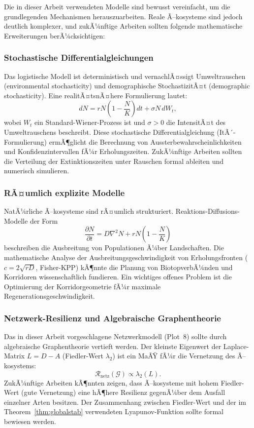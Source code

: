 ﻿\documentclass[a4paper,12pt]{article}
\theoremstyle{definition}
\begin{document}
Die in dieser Arbeit verwendeten Modelle sind bewusst vereinfacht, um die grundlegenden Mechanismen herauszuarbeiten. Reale Ã–kosysteme sind jedoch deutlich komplexer, und zukÃ¼nftige Arbeiten sollten folgende mathematische Erweiterungen berÃ¼cksichtigen:

\subsubsection{Stochastische Differentialgleichungen}

Das logistische Modell ist deterministisch und vernachlÃ¤ssigt Umweltrauschen (environmental stochasticity) und demographische StochastizitÃ¤t (demographic stochasticity). Eine realitÃ¤tsnÃ¤here Formulierung lautet:
\[
dN = r N\!\left(1 - \frac{N}{K}\right) dt + \sigma N\, dW_t,
\]
wobei $W_t$ ein Standard-Wiener-Prozess ist und $\sigma > 0$ die IntensitÃ¤t des Umweltrauschens beschreibt. Diese stochastische Differentialgleichung (ItÃ´-Formulierung) ermÃ¶glicht die Berechnung von Aussterbewahrscheinlichkeiten und Konfidenzintervallen fÃ¼r Erholungszeiten. ZukÃ¼nftige Arbeiten sollten die Verteilung der Extinktionszeiten unter Rauschen formal ableiten und numerisch simulieren.

\subsubsection{RÃ¤umlich explizite Modelle}

NatÃ¼rliche Ã–kosysteme sind rÃ¤umlich strukturiert. Reaktions-Diffusions-Modelle der Form
\[
\frac{\partial N}{\partial t} = D \nabla^2 N + rN\!\left(1 - \frac{N}{K}\right)
\]
beschreiben die Ausbreitung von Populationen Ã¼ber Landschaften. Die mathematische Analyse der Ausbreitungsgeschwindigkeit von Erholungsfronten ($c = 2\sqrt{rD}$, Fisher-KPP) kÃ¶nnte die Planung von BiotopverbÃ¼nden und Korridoren wissenschaftlich fundieren. Ein wichtiges offenes Problem ist die Optimierung der Korridorgeometrie fÃ¼r maximale Regenerationsgeschwindigkeit.

\subsubsection{Netzwerk-Resilienz und Algebraische Graphentheorie}

Das in dieser Arbeit vorgeschlagene Netzwerkmodell (Plot~8) sollte durch algebraische Graphentheorie vertieft werden. Der kleinste Eigenwert der Laplace-Matrix $L = D - A$ (Fiedler-Wert $\lambda_2$) ist ein MaÃŸ fÃ¼r die Vernetzung des Ã–kosystems:
\[
\mathcal{R}_{\text{netz}}(\mathcal{G}) \propto \lambda_2(L).
\]
ZukÃ¼nftige Arbeiten kÃ¶nnten zeigen, dass Ã–kosysteme mit hohem Fiedler-Wert (gute Vernetzung) eine hÃ¶here Resilienz gegenÃ¼ber dem Ausfall einzelner Arten besitzen. Der Zusammenhang zwischen Fiedler-Wert und der im Theorem~\ref{thm:globalstab} verwendeten Lyapunov-Funktion sollte formal bewiesen werden.
\end{document}
